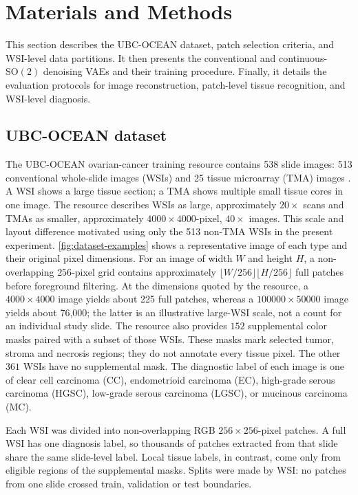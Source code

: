 \documentclass{midl}
\newcommand{\SOtwo}{\mathrm{SO}(2)}
\begin{document}
\section{Materials and Methods}
This section describes the UBC-OCEAN dataset, patch selection criteria, and WSI-level data partitions. It then presents the conventional and continuous-$\SOtwo$ denoising VAEs and their training procedure. Finally, it details the evaluation protocols for image reconstruction, patch-level tissue recognition, and WSI-level diagnosis.

\subsection{UBC-OCEAN dataset}

The UBC-OCEAN ovarian-cancer training resource contains 538 slide images: 513 conventional whole-slide images (WSIs) and 25 tissue microarray (TMA) images \cite{ubc_ocean_2023}. A WSI shows a large tissue section; a TMA shows multiple small tissue cores in one image. The resource describes WSIs as large, approximately $20\times$ scans and TMAs as smaller, approximately $4000\times4000$-pixel, $40\times$ images. This scale and layout difference motivated using only the 513 non-TMA WSIs in the present experiment. \autoref{fig:dataset-examples} shows a representative image of each type and their original pixel dimensions. For an image of width $W$ and height $H$, a non-overlapping $256$-pixel grid contains approximately $\lfloor W/256\rfloor\lfloor H/256\rfloor$ full patches before foreground filtering. At the dimensions quoted by the resource, a $4000\times4000$ image yields about 225 full patches, whereas a $100000\times50000$ image yields about 76,000; the latter is an illustrative large-WSI scale, not a count for an individual study slide. The resource also provides $152$ supplemental color masks paired with a subset of those WSIs. These masks mark selected tumor, stroma and necrosis regions; they do not annotate every tissue pixel. The other $361$ WSIs have no supplemental mask. The diagnostic label of each image is one of clear cell carcinoma (CC), endometrioid carcinoma (EC), high-grade serous carcinoma (HGSC), low-grade serous carcinoma (LGSC), or mucinous carcinoma (MC).

Each WSI was divided into non-overlapping RGB $256\times256$-pixel patches. A full WSI has one diagnosis label, so thousands of patches extracted from that slide share the same slide-level label. Local tissue labels, in contrast, come only from eligible regions of the supplemental masks. Splits were made by WSI: no patches from one slide crossed train, validation or test boundaries.
\end{document}
